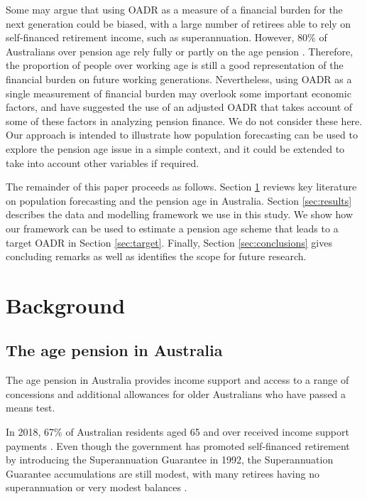 \documentclass[
  doublespace]{anzsauth}
\begin{document}
Some may argue that using OADR as a measure of a financial burden for the next generation could be biased, with a large number of retirees able to rely on self-financed retirement income, such as superannuation. However, 80\% of Australians over pension age rely fully or partly on the age pension \citep{Power14}. Therefore, the proportion of people over working age is still a good representation of the financial burden on future working generations. Nevertheless, using OADR as a single measurement of financial burden may overlook some important economic factors, and \citet{HY12} have suggested the use of an adjusted OADR that takes account of some of these factors in analyzing pension finance. We do not consider these here. Our approach is intended to illustrate how population forecasting can be used to explore the pension age issue in a simple context, and it could be extended to take into account other variables if required.

The remainder of this paper proceeds as follows. Section \ref{sec:litreview} reviews key literature on population forecasting and the pension age in Australia. Section \ref{sec:results} describes the data and modelling framework we use in this study. We show how our framework can be used to estimate a pension age scheme that leads to a target OADR in Section \ref{sec:target}. Finally, Section \ref{sec:conclusions} gives concluding remarks as well as identifies the scope for future research.

\hypertarget{sec:litreview}{%
\section{Background}\label{sec:litreview}}

\hypertarget{the-age-pension-in-australia}{%
\subsection{The age pension in Australia}\label{the-age-pension-in-australia}}

The age pension in Australia provides income support and access to a range of concessions and additional allowances for older Australians who have passed a means test.

In 2018, 67\% of Australian residents aged 65 and over received income support payments \citep{AIHW19}. Even though the government has promoted self-financed retirement by introducing the Superannuation Guarantee in 1992, the Superannuation Guarantee accumulations are still modest, with many retirees having no superannuation or very modest balances \citep{data61}.
\end{document}
